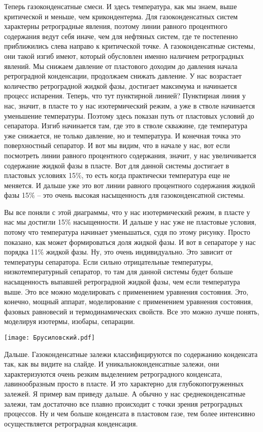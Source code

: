 \documentclass[main.tex]{subfiles}
\begin{document}
Теперь газоконденсатные смеси.
И здесь температура, как мы знаем, выше критической и меньше, чем крикондентерма.
Для газоконденсатных систем характерны ретроградные явления, поэтому линии равного процентного содержания ведут себя иначе, чем для нефтяных систем, где те постепенно приближились слева направо к критической точке.
А газоконденсатные системы, они такой изгиб имеют, который обусловлен именно наличием ретроградных явлений.
Мы снижаем давление от пластового доходим до давления начала ретроградной конденсации, продолжаем снижать давление.
У нас возрастает количество ретроградной жидкой фазы, достигает максимума и начинается процесс испарения.
Теперь, что тут пунктирной линией?
Пунктирная линия у нас, значит, в пласте то у нас изотермический режим, а уже в стволе начинается уменьшение температуры.
Поэтому здесь показан путь от пластовых условий до сепаратора.
Изгиб начинается там, где это в стволе скважине, где температура уже снижается, не только давление, но и температура.
И конечная точка это поверхностный сепаратор.
И вот мы видим, что в начале у нас, вот если посмотреть линии равного процентного содержания, значит, у нас увеличивается содержание жидкой фазы в пласте.
Вот для данной системы достигает в пластовых условиях 15\%, то есть когда практически температура еще не меняется.
И дальше уже это вот линии равного процентного содержания жидкой фазы 15\% -- это очень высокая насыщенность для газоконденсатной системы.

Вы все поняли с этой диаграммы, что у нас изотермический режим, в пласте у нас мы достигли 15\% насыщенности.
И дальше у нас уже не пластовые условия, потому что температура начинает уменьшаться, судя по этому рисунку.
Просто показано, как может формироваться доля жидкой фазы.
И вот в сепараторе у нас порядка 11\% жидкой фазы.
Ну, это очень индивидуально.
Это зависит от температуры сепаратора.
Если сильно отрицательные температуры, низкотемпературный сепаратор, то там для данной системы будет больше насыщенность выпавшей ретроградной жидкой фазы, чем если температура выше.
Это все можно моделировать с применением уравнения состояния.
Это, конечно, мощный аппарат, моделирование с применением уравнения состояния, фазовых равновесий и термодинамических свойств.
Все это можно лучше понять, моделируя изотермы, изобары, сепарации.

\begin{center}
\texttt{[image: Брусиловский.pdf]}
\end{center}

Дальше.
Газоконденсатные залежи классифицируются по содержанию конденсата так, как вы видите на слайде.
И уникальноконденсатные залежи, они характеризуются очень резким выделением ретроградного конденсата, лавинообразным просто в пласте.
И это характерно для глубокопогруженных залежей.
Я пример вам приведу дальше.
А обычно у нас среднеконденсатные залежи, там достаточно все плавно происходит с точки зрения ретроградных процессов.
Ну и чем больше конденсата в пластовом газе, тем более интенсивно осуществляется ретроградная конденсация.
\end{document}
